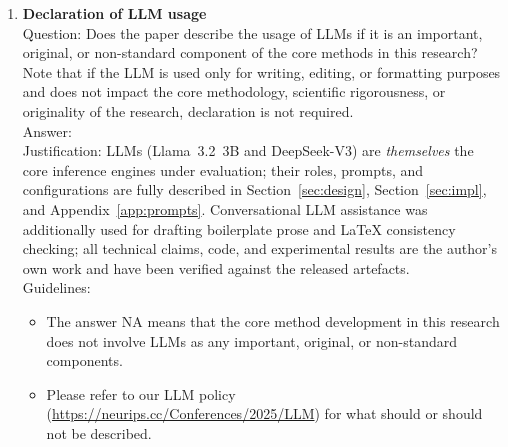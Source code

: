 \documentclass{article}
\begin{document}
\begin{enumerate}
\item {\bf Declaration of LLM usage}\\
Question: Does the paper describe the usage of LLMs if it is an important, original, or non-standard component of the core methods in this research? Note that if the LLM is used only for writing, editing, or formatting purposes and does not impact the core methodology, scientific rigorousness, or originality of the research, declaration is not required.\\
Answer: \answerYes{}\\
Justification: LLMs (Llama~3.2~3B and DeepSeek-V3) are \emph{themselves} the core inference engines under evaluation; their roles, prompts, and configurations are fully described in Section~\ref{sec:design}, Section~\ref{sec:impl}, and Appendix~\ref{app:prompts}. Conversational LLM assistance was additionally used for drafting boilerplate prose and LaTeX consistency checking; all technical claims, code, and experimental results are the author's own work and have been verified against the released artefacts.\\
Guidelines:
\begin{itemize}
\item The answer NA means that the core method development in this research does not involve LLMs as any important, original, or non-standard components.
\item Please refer to our LLM policy (\url{https://neurips.cc/Conferences/2025/LLM}) for what should or should not be described.
\end{itemize}

\end{enumerate}
\end{document}
